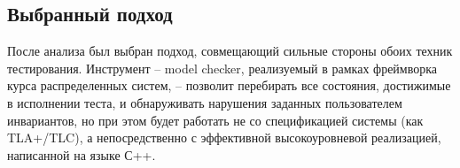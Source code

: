 \subsection{Выбранный подход}

После анализа был выбран подход, совмещающий сильные стороны обоих техник тестирования. Инструмент – model checker, реализуемый в рамках фреймворка курса распределенных систем, – позволит перебирать все состояния, достижимые в исполнении теста, и обнаруживать нарушения заданных пользователем инвариантов, но при этом будет работать не со спецификацией системы (как TLA+/TLC), а непосредственно с эффективной высокоуровневой реализацией, написанной на языке С++.
